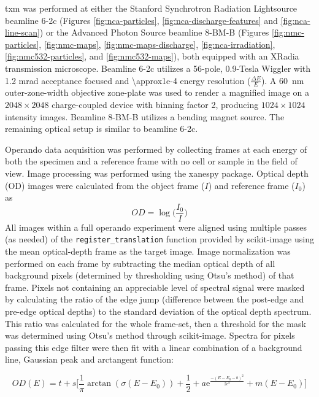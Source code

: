 \documentclass{article}
\begin{document}
\gls{txm} was performed at either the Stanford Synchrotron Radiation
Lightsource beamline 6-2c (Figures \ref{fig:nca-particles},
\ref{fig:nca-discharge-features} and \ref{fig:nca-line-scan}) or the
Advanced Photon Source beamline 8-BM-B (Figures
\ref{fig:nmc-particles}, \ref{fig:nmc-maps},
\ref{fig:nmc-maps-discharge}, \ref{fig:nca-irradiation},
\ref{fig:nmc532-particles}, and \ref{fig:nmc532-maps}), both equipped
with an XRadia transmission microscope. Beamline 6-2c utilizes a
56-pole, 0.9-Tesla Wiggler with 1.2 mrad acceptance focused and
\num{\approx1e-4} energy resolution ($\frac{\Delta E}{E}$). A
\SI{60}{nm} outer-zone-width objective zone-plate was used to render a
magnified image on a $2048 \times 2048$ charge-coupled device with
binning factor 2, producing $1024 \times 1024$ intensity
images. Beamline 8-BM-B utilizes a bending magnet source. The
remaining optical setup is similar to beamline 6-2c.

Operando data acquisition was performed by collecting frames at each
energy of both the specimen and a reference frame with no cell or
sample in the field of view. Image processing was performed using the
xanespy package\cite{xanespy}. Optical depth (OD) images were
calculated from the object frame ($I$) and reference frame ($I_0$) as
$$OD = \log{\big(\frac{I_0}{I}\big)}$$ All images within a full
operando experiment were aligned using multiple passes (as needed) of
the \texttt{register\_translation} function provided by
scikit-image\cite{walt2014} using the mean optical-depth frame as the
target image. Image normalization was performed on each frame by
subtracting the median optical depth of all background pixels
(determined by thresholding using Otsu's method\cite{otsu1979}) of
that frame\cite{jin2015}. Pixels not containing an appreciable level
of  spectral signal were masked by calculating the ratio of the
edge jump (difference between the post-edge and pre-edge optical
depths) to the standard deviation of the optical depth spectrum. This
ratio was calculated for the whole frame-set, then a threshold for the
mask was determined using Otsu's method\cite{otsu1979} through
scikit-image\cite{walt2014}. Spectra for pixels passing this edge
filter were then fit with a linear combination of a background line,
Gaussian peak and arctangent function:

\begin{equation}
  OD(E) = t + s\bigg[\frac{1}{\pi}\arctan(\sigma (E-E_0)) + \frac{1}{2} +
    a\mathrm{e}^{\frac{-(E-E_0-b)^2}{2c^2}} + m(E-E_0)\bigg]
  \label{eq:kedge-fitting}
\end{equation}
\end{document}
